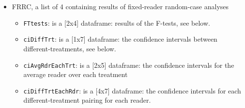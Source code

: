 \documentclass[
]{book}
\providecommand{\tightlist}{%
  \setlength{\itemsep}{0pt}\setlength{\parskip}{0pt}}
\begin{document}
\begin{itemize}
\tightlist
\item
  FRRC, a list of 4 containing results of fixed-reader random-case analyses

  \begin{itemize}
  \tightlist
  \item
    \texttt{FTtests}: is a {[}2x4{]} dataframe: results of the F-tests, see below.
  \item
    \texttt{ciDiffTrt}: is a {[}1x7{]} dataframe: the confidence intervals between different-treatments, see below.
  \item
    \texttt{ciAvgRdrEachTrt}: is a {[}2x5{]} dataframe: the confidence intervals for the average reader over each treatment
  \item
    \texttt{ciDiffTrtEachRdr}: is a {[}4x7{]} dataframe: the confidence intervals for each different-treatment pairing for each reader.
  \end{itemize}
\end{itemize}
\end{document}
